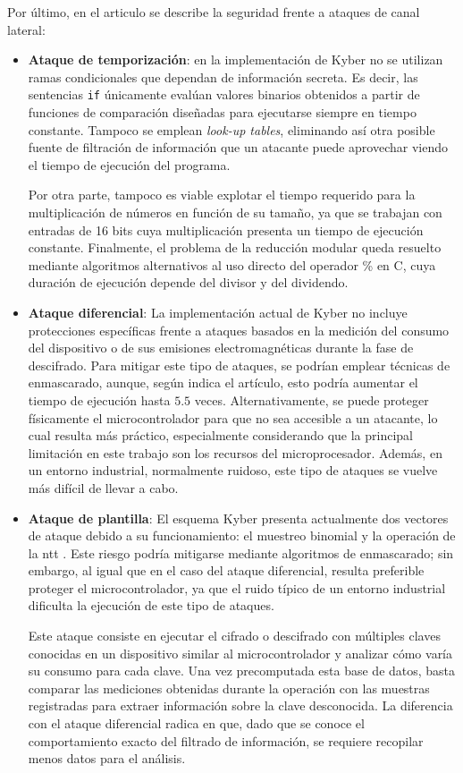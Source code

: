 Por último, en el articulo se describe la seguridad frente a ataques de canal lateral:
\begin{itemize}
	\item \textbf{Ataque de temporización}: en la implementación de Kyber no se utilizan ramas condicionales que dependan de información secreta. Es decir, las sentencias \texttt{if} únicamente evalúan valores binarios obtenidos a partir de funciones de comparación diseñadas para ejecutarse siempre en tiempo constante. Tampoco se emplean \textit{look-up tables}, eliminando así otra posible fuente de filtración de información que un atacante puede aprovechar viendo el tiempo de ejecución del programa.
	\newline
	
	Por otra parte, tampoco es viable explotar el tiempo requerido para la multiplicación de números en función de su tamaño, ya que se trabajan con entradas de 16 bits cuya multiplicación presenta un tiempo de ejecución constante. Finalmente, el problema de la reducción modular queda resuelto mediante algoritmos alternativos al uso directo del operador \% en C, cuya duración de ejecución depende del divisor y del dividendo.
	\item \textbf{Ataque diferencial}: La implementación actual de Kyber no incluye protecciones específicas frente a ataques basados en la medición del consumo del dispositivo o de sus emisiones electromagnéticas durante la fase de descifrado. Para mitigar este tipo de ataques, se podrían emplear técnicas de enmascarado, aunque, según indica el artículo, esto podría aumentar el tiempo de ejecución hasta $5.5$ veces. Alternativamente, se puede proteger físicamente el microcontrolador para que no sea accesible a un atacante, lo cual resulta más práctico, especialmente considerando que la principal limitación en este trabajo son los recursos del microprocesador. Además, en un entorno industrial, normalmente ruidoso, este tipo de ataques se vuelve más difícil de llevar a cabo.
	
	\item \textbf{Ataque de plantilla}: El esquema Kyber presenta actualmente dos vectores de ataque debido a su funcionamiento: el muestreo binomial \cite{Peng_Kuhn_2025} y la operación de la \acrshort{ntt} \cite{cryptoeprint:2019/795}. Este riesgo podría mitigarse mediante algoritmos de enmascarado; sin embargo, al igual que en el caso del ataque diferencial, resulta preferible proteger el microcontrolador, ya que el ruido típico de un entorno industrial dificulta la ejecución de este tipo de ataques.
	\newline
	
	Este ataque consiste en ejecutar el cifrado o descifrado con múltiples claves conocidas en un dispositivo similar al microcontrolador y analizar cómo varía su consumo para cada clave. Una vez precomputada esta base de datos, basta comparar las mediciones obtenidas durante la operación con las muestras registradas para extraer información sobre la clave desconocida. La diferencia con el ataque diferencial radica en que, dado que se conoce el comportamiento exacto del filtrado de información, se requiere recopilar menos datos para el análisis.
\end{itemize}
\newpage
